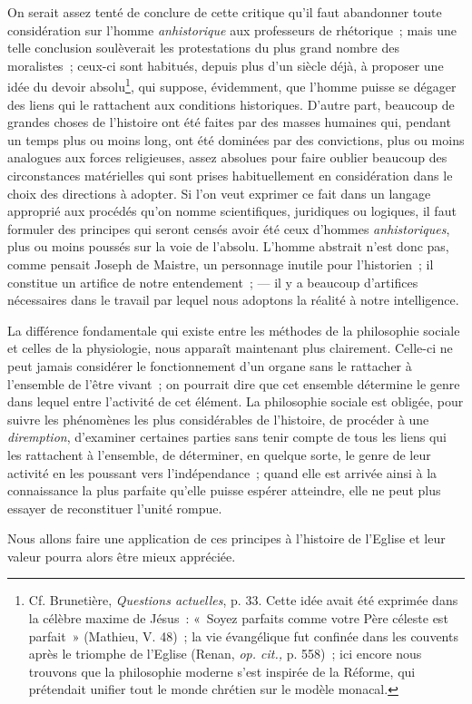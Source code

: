 \documentclass[french,twoside]{book} %
\begin{document}
On serait assez tenté de conclure de cette critique qu’il faut abandonner toute considération sur l’homme \emph{anhistorique} aux professeurs de rhétorique ; mais une telle conclusion soulèverait les protestations du plus grand nombre des moralistes ; ceux-ci sont habitués, depuis plus  d’un siècle déjà, à proposer une idée du devoir absolu\footnote{ \noindent Cf. Brunetière, \emph{Questions actuelles}, p. 33. Cette idée avait été exprimée dans la célèbre maxime de Jésus : « Soyez parfaits comme votre Père céleste est parfait » (Mathieu, V. 48) ; la vie évangélique fut confinée dans les couvents après le triomphe de l’Eglise (Renan, \emph{op. cit., }p. 558) ; ici encore nous trouvons que la philosophie moderne s’est inspirée de la Réforme, qui prétendait unifier tout le monde chrétien sur le modèle monacal.
 }, qui suppose, évidemment, que l’homme puisse se dégager des liens qui le rattachent aux conditions historiques. D’autre part, beaucoup de grandes choses de l’histoire ont été faites par des masses humaines qui, pendant un temps plus ou moins long, ont été dominées par des convictions, plus ou moins analogues aux forces religieuses, assez absolues pour faire oublier beaucoup des circonstances matérielles qui sont prises habituellement en considération dans le choix des directions à adopter. Si l’on veut exprimer ce fait dans un langage approprié aux procédés qu’on nomme scientifiques, juridiques ou logiques, il faut formuler des principes qui seront censés avoir été ceux d’hommes \emph{anhistoriques}, plus ou moins poussés sur la voie de l’absolu. L’homme abstrait n’est donc pas, comme pensait Joseph de Maistre, un personnage inutile pour l’historien ; il constitue un artifice de notre entendement ; — il y a beaucoup d’artifices nécessaires dans le travail par lequel nous adoptons la réalité à notre intelligence.\par
La différence fondamentale qui existe entre les méthodes de la philosophie sociale et celles de la physiologie, nous apparaît maintenant plus clairement. Celle-ci ne peut  jamais considérer le fonctionnement d’un organe sans le rattacher à l’ensemble de l’être vivant ; on pourrait dire que cet ensemble détermine le genre dans lequel entre l’activité de cet élément. La philosophie sociale est obligée, pour suivre les phénomènes les plus considérables de l’histoire, de procéder à une \emph{diremption}, d’examiner certaines parties sans tenir compte de tous les liens qui les rattachent à l’ensemble, de déterminer, en quelque sorte, le genre de leur activité en les poussant vers l’indépendance ; quand elle est arrivée ainsi à la connaissance la plus parfaite qu’elle puisse espérer atteindre, elle ne peut plus essayer de reconstituer l’unité rompue.\par
Nous allons faire une application de ces principes à l’histoire de l’Eglise et leur valeur pourra alors être mieux appréciée.
\end{document}

